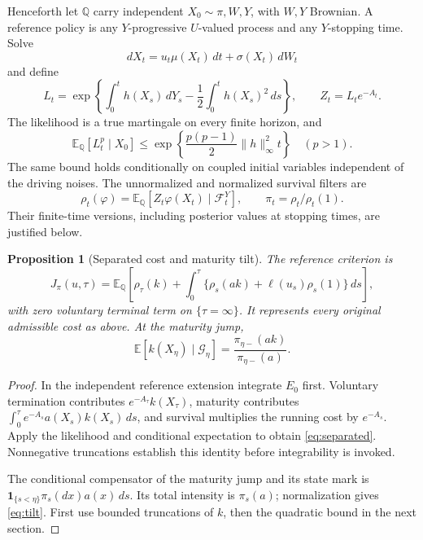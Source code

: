 \documentclass[11pt,a4paper]{article}
\newtheorem{proposition}[theorem]{Proposition}
\theoremstyle{definition}
\theoremstyle{remark}
\newcommand{\E}{\mathbb E}
\newcommand{\Qq}{\mathbb Q}
\newcommand{\ind}{\mathbf 1}
\begin{document}
Henceforth let \(\Qq\) carry independent \(X_0\sim\pi,W,Y\), with \(W,Y\)
Brownian. A reference policy is any \(Y\)-progressive \(U\)-valued process
and any \(Y\)-stopping time. Solve
\[
 dX_t=u_t\mu(X_t)\,dt+\sigma(X_t)\,dW_t
\]
and define
\begin{equation}\label{eq:likelihood}
 L_t=\exp\left\{\int_0^t h(X_s)\,dY_s
                     -\frac12\int_0^t h(X_s)^2\,ds\right\},
 \qquad Z_t=L_te^{-A_t}.
\end{equation}
The likelihood is a true martingale on every finite horizon, and
\begin{equation}\label{eq:Lmoment}
 \E_\Qq[L_t^p\mid X_0]\leq
 \exp\left\{\frac{p(p-1)}2\|h\|_\infty^2t\right\}\quad(p>1).
\end{equation}
The same bound holds conditionally on coupled initial variables
independent of the driving noises. The unnormalized and normalized
survival filters are
\begin{equation}\label{eq:rho}
 \rho_t(\varphi)=\E_\Qq[Z_t\varphi(X_t)\mid\mathcal F_t^Y],
 \qquad \pi_t=\rho_t/\rho_t(1).
\end{equation}
Their finite-time versions, including posterior values at stopping
times, are justified below.

\begin{proposition}[Separated cost and maturity tilt]\label{prop:cost}
The reference criterion is
\begin{equation}\label{eq:separated}
 J_\pi(u,\tau)=
 \E_\Qq\left[\rho_\tau(k)+
       \int_0^\tau\{\rho_s(ak)+\ell(u_s)\rho_s(1)\}\,ds\right],
\end{equation}
with zero voluntary terminal term on \(\{\tau=\infty\}\). It represents
every original admissible cost as above. At the maturity jump,
\begin{equation}\label{eq:tilt}
 \E[k(X_\eta)\mid\mathcal G_\eta]
       =\frac{\pi_{\eta-}(ak)}{\pi_{\eta-}(a)}.
\end{equation}
\end{proposition}
\begin{proof}
In the independent reference extension integrate \(E_0\) first.
Voluntary termination contributes \(e^{-A_\tau}k(X_\tau)\), maturity
contributes \(\int_0^\tau e^{-A_s}a(X_s)k(X_s)\,ds\), and survival
multiplies the running cost by \(e^{-A_s}\). Apply the likelihood
and conditional expectation to obtain \eqref{eq:separated}.
Nonnegative truncations establish this identity before integrability
is invoked.

The conditional compensator of the maturity jump and its state mark is
\(\ind_{\{s<\eta\}}\pi_s(dx)a(x)\,ds\).
Its total intensity is \(\pi_s(a)\); normalization gives
\eqref{eq:tilt}. First use bounded truncations of \(k\), then the
quadratic bound in the next section.
\end{proof}
\end{document}
